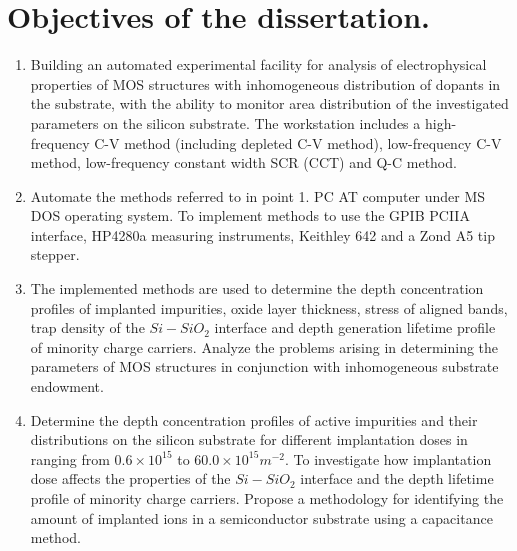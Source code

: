 
\chapter{Objectives of the dissertation.}\label{Chapter2}

\begin{enumerate}
\item Building an automated experimental facility for analysis of
  electrophysical properties of MOS structures with inhomogeneous
  distribution of dopants in the substrate, with the ability to
  monitor area distribution of the investigated parameters on the
  silicon substrate.  The workstation includes a high-frequency C-V
  method (including depleted C-V method), low-frequency C-V method,
  low-frequency constant width SCR (CCT) and Q-C method.
\item Automate the methods referred to in point 1.  PC AT computer
  under MS DOS operating system.  To implement methods to use the GPIB
  PCIIA interface, HP4280a measuring instruments, Keithley 642 and a
  Zond A5 tip stepper.
\item The implemented methods are used to determine the depth
  concentration profiles of implanted impurities, oxide layer
  thickness, stress of aligned bands, trap density of the $Si-SiO_2$
  interface and depth generation lifetime profile of minority charge
  carriers.  Analyze the problems arising in determining the
  parameters of MOS structures in conjunction with inhomogeneous
  substrate endowment.
\item Determine the depth concentration profiles of active impurities
  and their distributions on the silicon substrate for different
  implantation doses in ranging from $0.6\times{10}^{15}$ to
  $60.0\times{10}^{15}{m}^{-2}$. To investigate how implantation dose
  affects the properties of the $Si-SiO_2$ interface and the depth
  lifetime profile of minority charge carriers.  Propose a methodology
  for identifying the amount of implanted ions in a semiconductor
  substrate using a capacitance method.
\end{enumerate}
